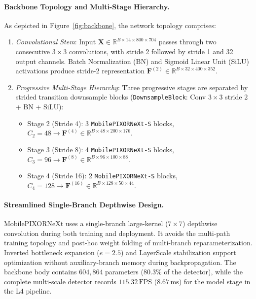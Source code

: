 \paragraph{Backbone Topology and Multi-Stage Hierarchy.}
As depicted in Figure~\ref{fig:backbone}, the network topology comprises:
\begin{enumerate}
    \item \textit{Convolutional Stem}: Input $\mathbf{X} \in \mathbb{R}^{B \times 14 \times 800 \times 704}$ passes through two consecutive $3 \times 3$ convolutions, with stride 2 followed by stride 1 and 32 output channels. Batch Normalization (BN) and Sigmoid Linear Unit (SiLU) activations produce stride-2 representation $\mathbf{F}^{(2)} \in \mathbb{R}^{B \times 32 \times 400 \times 352}$.
    \item \textit{Progressive Multi-Stage Hierarchy}: Three progressive stages are separated by strided transition downsample blocks (\texttt{DownsampleBlock}: Conv $3 \times 3$ stride 2 + BN + SiLU):
    \begin{itemize}
        \item Stage 2 (Stride 4): 3 \texttt{MobilePIXORNeXt-S} blocks, $C_2 = 48 \rightarrow \mathbf{F}^{(4)} \in \mathbb{R}^{B \times 48 \times 200 \times 176}$.
        \item Stage 3 (Stride 8): 4 \texttt{MobilePIXORNeXt-S} blocks, $C_3 = 96 \rightarrow \mathbf{F}^{(8)} \in \mathbb{R}^{B \times 96 \times 100 \times 88}$.
        \item Stage 4 (Stride 16): 2 \texttt{MobilePIXORNeXt-S} blocks, $C_4 = 128 \rightarrow \mathbf{F}^{(16)} \in \mathbb{R}^{B \times 128 \times 50 \times 44}$.
    \end{itemize}
\end{enumerate}

\paragraph{Streamlined Single-Branch Depthwise Design.}
MobilePIXORNeXt uses a single-branch large-kernel ($7 \times 7$) depthwise convolution during both training and deployment. It avoids the multi-path training topology and post-hoc weight folding of multi-branch reparameterization. Inverted bottleneck expansion ($e=2.5$) and LayerScale stabilization support optimization without auxiliary-branch memory during backpropagation. The backbone body contains $604,864$ parameters ($80.3\%$ of the detector), while the complete multi-scale detector records $115.32\,\text{FPS}$ ($8.67\,\text{ms}$) for the model stage in the L4 pipeline.

